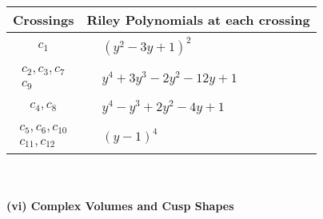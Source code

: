\documentclass[1p]{elsarticle_modified}
\theoremstyle{definition}
\begin{document}
\begin{tabular}{m{50pt}|m{274pt}}
Crossings & \hspace{64pt}Riley Polynomials at each crossing \\
\hline $$\begin{aligned}c_{1}\end{aligned}$$&$\begin{aligned}
&(y^2-3 y+1)^2
\end{aligned}$\\
\hline $$\begin{aligned}c_{2},c_{3},c_{7}\\c_{9}\end{aligned}$$&$\begin{aligned}
&y^4+3 y^3-2 y^2-12 y+1
\end{aligned}$\\
\hline $$\begin{aligned}c_{4},c_{8}\end{aligned}$$&$\begin{aligned}
&y^4- y^3+2 y^2-4 y+1
\end{aligned}$\\
\hline $$\begin{aligned}c_{5},c_{6},c_{10}\\c_{11},c_{12}\end{aligned}$$&$\begin{aligned}
&(y-1)^4
\end{aligned}$\\
\hline
\end{tabular}\\~\\
\newpage\flushleft \textbf{(vi) Complex Volumes and Cusp Shapes}
\end{document}
